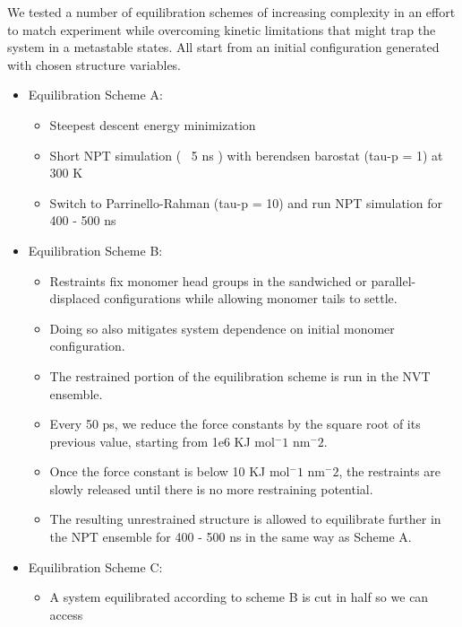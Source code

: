 \documentclass{article}
\begin{document}
  We tested a number of equilibration schemes of increasing complexity in an effort
  to match experiment while overcoming kinetic limitations that might trap the system 
  in a metastable states. All start from an initial configuration generated with 
  chosen structure variables. 
  \begin{itemize}
      \item Equilibration Scheme A:
      \begin{itemize}
          \item Steepest descent energy minimization
          \item Short NPT simulation (~ 5 ns ) with berendsen barostat (tau-p = 1) at 300 K 
          \item Switch to Parrinello-Rahman (tau-p = 10) and run NPT simulation for 400 - 500 ns
      \end{itemize}
      \item Equilibration Scheme B:
      \begin{itemize}
          \item Restraints fix monomer head groups in the sandwiched or parallel-displaced
          configurations while allowing monomer tails to settle.
          \item Doing so also mitigates system dependence on initial monomer configuration.
          \item The restrained portion of the equilibration scheme is run in the NVT ensemble.
          \item Every 50 ps, we reduce the force constants by the square root of its
          previous value, starting from 1e6 KJ mol$^-1$ nm$^-2$.
          \item Once the force constant is below 10 KJ mol$^-1$ nm$^-2$, the restraints are
          slowly released until there is no more restraining potential.
          \item The resulting unrestrained structure is allowed to equilibrate further in the NPT
          ensemble for 400 - 500 ns in the same way as Scheme A.
      \end{itemize}
      \item Equilibration Scheme C:
      \begin{itemize} 
          \item A system equilibrated according to scheme B is cut in half so we can access

\end{itemize}
\end{itemize}
\end{document}
